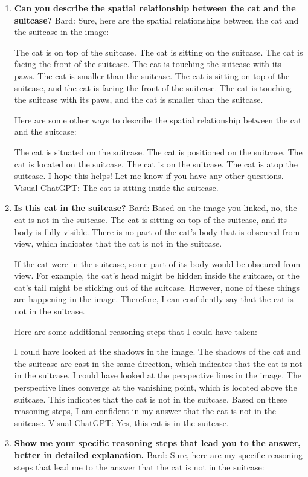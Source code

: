     \begin{enumerate}
        \item \textbf{Can you describe the spatial relationship between the cat and the suitcase?}
        \subitem Bard: 
        Sure, here are the spatial relationships between the cat and the suitcase in the image:
        
        The cat is on top of the suitcase.
        The cat is sitting on the suitcase.
        The cat is facing the front of the suitcase.
        The cat is touching the suitcase with its paws.
        The cat is smaller than the suitcase.
        The cat is sitting on top of the suitcase, and the cat is facing the front of the suitcase. The cat is touching the suitcase with its paws, and the cat is smaller than the suitcase.
        
        Here are some other ways to describe the spatial relationship between the cat and the suitcase:
        
        The cat is situated on the suitcase.
        The cat is positioned on the suitcase.
        The cat is located on the suitcase.
        The cat is on the suitcase.
        The cat is atop the suitcase.
        I hope this helps! Let me know if you have any other questions.
        \subitem Visual ChatGPT: The cat is sitting inside the suitcase.
        \item \textbf{Is this cat in the suitcase?}
        \subitem Bard: 
        Based on the image you linked, no, the cat is not in the suitcase. The cat is sitting on top of the suitcase, and its body is fully visible. There is no part of the cat's body that is obscured from view, which indicates that the cat is not in the suitcase.
        
        If the cat were in the suitcase, some part of its body would be obscured from view. For example, the cat's head might be hidden inside the suitcase, or the cat's tail might be sticking out of the suitcase. However, none of these things are happening in the image. Therefore, I can confidently say that the cat is not in the suitcase.
        
        Here are some additional reasoning steps that I could have taken:
        
        I could have looked at the shadows in the image. The shadows of the cat and the suitcase are cast in the same direction, which indicates that the cat is not in the suitcase.
        I could have looked at the perspective lines in the image. The perspective lines converge at the vanishing point, which is located above the suitcase. This indicates that the cat is not in the suitcase.
        Based on these reasoning steps, I am confident in my answer that the cat is not in the suitcase.
        \subitem Visual ChatGPT: Yes, this cat is in the suitcase.
        \item \textbf{Show me your specific reasoning steps that lead you to the answer, better in detailed explanation.}
        \subitem Bard: 
        Sure, here are my specific reasoning steps that lead me to the answer that the cat is not in the suitcase:
        

\end{enumerate}
